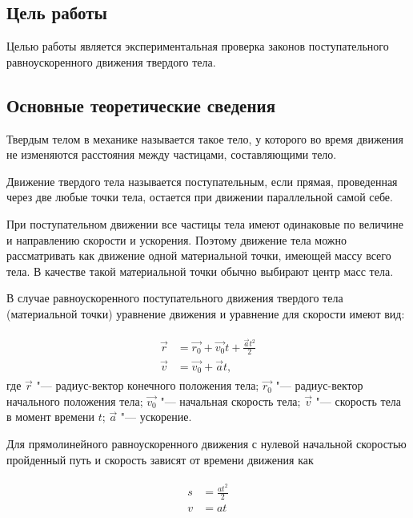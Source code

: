 \documentclass[a4paper, 12pt]{extarticle}
\begin{document}
\MTDTitlePage
\MTDInfoPage

\setcounter{section}{2}

\subsection{Цель работы}
Целью работы является экспериментальная проверка законов поступательного равноускоренного движения твердого тела.

\subsection{Основные теоретические сведения}
Твердым телом в механике называется такое тело, у которого во время движения не изменяются расстояния между частицами, составляющими тело.

Движение твердого тела называется поступательным, если прямая, проведенная через две любые точки тела, остается при движении параллельной самой себе.

При поступательном движении все частицы тела имеют одинаковые по величине и направлению скорости и ускорения. Поэтому движение тела можно рассматривать как движение одной материальной точки, имеющей массу всего тела. В качестве такой материальной точки обычно выбирают центр масс тела.

В случае равноускоренного поступательного движения твердого тела (материальной точки) уравнение движения и уравнение для скорости имеют вид:

\begin{align}
\label{eq:m2-uni-acc-motion}
\begin{split}
\vec{r} &= \vec{r_0} + \vec{v_0}t + \frac{\vec{a}t^2}{2} \\
\vec{v} &= \vec{v_0} + \vec{a}t,
\end{split}
\end{align}
где $\vec{r}$ "--- радиус-вектор конечного положения тела;
$\vec{r_0}$ "--- радиус-вектор начального положения тела;
$\vec{v_0}$ "--- начальная скорость тела;
$\vec{v}$ "--- скорость тела в момент времени $t$;
$\vec{a}$ "--- ускорение. %

Для прямолинейного равноускоренного движения с нулевой начальной скоростью пройденный путь и скорость зависят от времени движения как %

\begin{align}
\label{eq:m2-uni-acc-lin-motion}
\begin{split}
s &= \frac{at^2}{2} \\
v &= at
\end{split}
\end{align}
\end{document}
